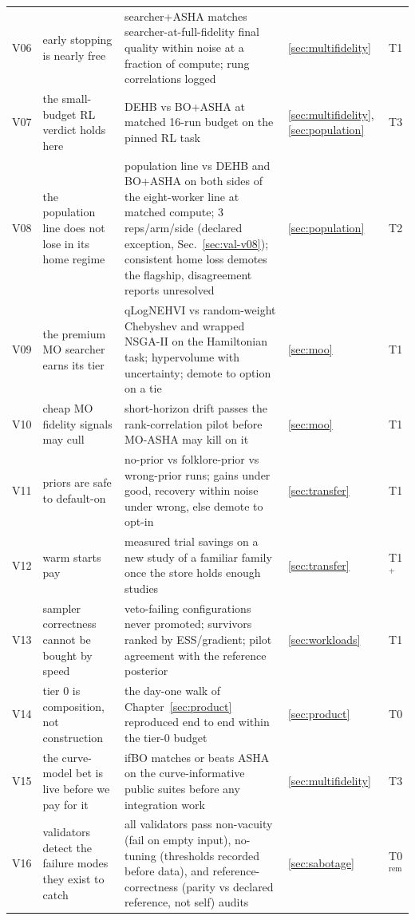 \begin{table}[tp]
\begin{tabularx}{\textwidth}{@{}l>{\raggedright\arraybackslash}X>{\raggedright\arraybackslash}Xll@{}}
V06 & early stopping is nearly free & searcher+ASHA matches
searcher-at-full-fidelity final quality within noise at a fraction
of compute; rung correlations logged & \ref{sec:multifidelity} & T1 \\
V07 & the small-budget RL verdict holds here & DEHB vs BO+ASHA at
matched 16-run budget on the pinned RL task & \ref{sec:multifidelity},
\ref{sec:population} & T3 \\
V08 & the population line does not lose in its home regime & population line vs
DEHB and BO+ASHA on both sides of the eight-worker line at matched
compute; 3 reps/arm/side (declared exception,
Sec.~\ref{sec:val-v08}); consistent home loss demotes the flagship,
disagreement reports unresolved & \ref{sec:population} & T2 \\
V09 & the premium MO searcher earns its tier & qLogNEHVI vs
random-weight Chebyshev and wrapped NSGA-II on the Hamiltonian task;
hypervolume with uncertainty; demote to option on a tie & \ref{sec:moo} & T1 \\
V10 & cheap MO fidelity signals may cull & short-horizon drift
passes the rank-correlation pilot before MO-ASHA may kill on it & \ref{sec:moo} & T1 \\
V11 & priors are safe to default-on & no-prior vs folklore-prior vs
wrong-prior runs; gains under good, recovery within noise under
wrong, else demote to opt-in & \ref{sec:transfer} & T1 \\
V12 & warm starts pay & measured trial savings on a new study of a
familiar family once the store holds enough studies & \ref{sec:transfer} & T1$^{+}$ \\
V13 & sampler correctness cannot be bought by speed & veto-failing
configurations never promoted; survivors ranked by ESS/gradient;
pilot agreement with the reference posterior & \ref{sec:workloads} & T1 \\
V14 & tier 0 is composition, not construction & the day-one walk of
Chapter~\ref{sec:product} reproduced end to end within the tier-0
budget & \ref{sec:product} & T0 \\
V15 & the curve-model bet is live before we pay for it & ifBO
matches or beats ASHA on the curve-informative public suites before
any integration work & \ref{sec:multifidelity} & T3 \\
V16 & validators detect the failure modes they exist to catch &
all validators pass non-vacuity (fail on empty input), no-tuning
(thresholds recorded before data), and reference-correctness (parity
vs declared reference, not self) audits & \ref{sec:sabotage} & T0$^{\mathrm{rem}}$ \\
\bottomrule
\end{tabularx}
\end{table}

